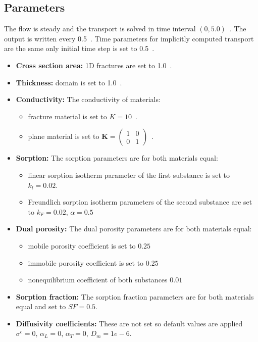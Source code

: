 \subsection*{Parameters}
The flow is steady and the transport is solved in time interval $(0,5.0)$~. The output is written every 0.5~. 
Time parameters for implicitly computed transport are the same only initial time step is set to 0.5~.
\begin{itemize}
  \item \textbf{Cross section area:} 1D fractures are set to 1.0~.
  \item \textbf{Thickness:} domain is set to 1.0~.
  \item \textbf{Conductivity:} The conductivity of materials:
    \begin{itemize}
      \item fracture material is set to $K=10$~.
      \item plane material is set to $\mathbf{K}=\left(\begin{array}{cc} 1 & 0 \\ 0 & 1\end{array} \right)$~.
    \end{itemize}
  \item \textbf{Sorption:} The sorption parameters are for both materials equal:
    \begin{itemize}
      \item linear sorption isotherm parameter of the first substance is set to $k_l=0.02$.
      \item Freundlich sorption isotherm parameters of the second substance are set to $k_F=0.02$, $\alpha=0.5$  
    \end{itemize}
  \item \textbf{Dual porosity:} The dual porosity parameters are for both materials equal:
    \begin{itemize}
      \item mobile porosity coefficient is set to $0.25$
      \item immobile porosity coefficient is set to $0.25$
      \item nonequilibrium coefficient of both substances $0.01$
    \end{itemize}
  \item \textbf{Sorption fraction:} The sorption fraction parameters are for both materials equal and set to $SF=0.5$.
  \item \textbf{Diffusivity coefficients:} These are not set so default values are applied 
	$\sigma^c=0$, $\alpha_L=0$, $\alpha_T=0$, $D_m=1e-6$.
\end{itemize}

